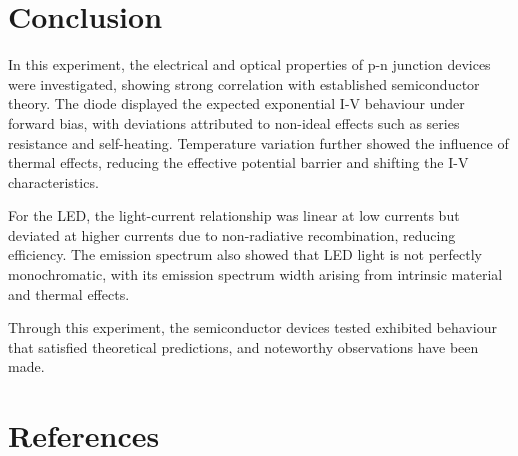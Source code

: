 \documentclass[1pt]{article}
\begin{document}
\section{Conclusion}

In this experiment, the electrical and optical properties of p-n junction devices were investigated, showing strong correlation with established semiconductor theory. The diode displayed the expected exponential I-V behaviour under forward bias, with deviations attributed to non-ideal effects such as series resistance and self-heating. Temperature variation further showed the influence of thermal effects, reducing the effective potential barrier and shifting the I-V characteristics. 

For the LED, the light-current relationship was linear at low currents but deviated at higher currents due to non-radiative recombination, reducing efficiency. The emission spectrum also showed that LED light is not perfectly monochromatic, with its emission spectrum width arising from intrinsic material and thermal effects. 

Through this experiment, the semiconductor devices tested exhibited behaviour that satisfied theoretical predictions, and noteworthy observations have been made.


\section{References}

\printbibliography
\end{document}
